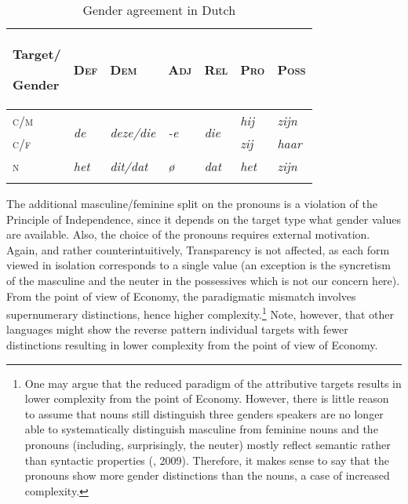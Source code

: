 \documentclass[output=collectionpaper]{langsci/langscibook}
\begin{document}
\begin{table}
\begin{tabularx}{\textwidth}{XXXXXXX}
\lsptoprule
{\bfseries Target/}

\bfseries Gender & \bfseries \textsc{Def} & \bfseries \textsc{Dem} & \bfseries \textsc{Adj} & \bfseries \textsc{Rel} & \bfseries \textsc{Pro} & \bfseries \textsc{Poss}\\
\midrule
\textsc{c/m} & \multirow{2}{*}{\textit{de}} & \multirow{2}{*}{\textit{deze/die}} & \multirow{2}{*}{\textit{{}-e}} & \multirow{2}{*}{\textit{die}} & \textit{hij} & \textit{zijn}\\
\textsc{c/f} &  &  &  &  & \textit{zij} & \textit{haar}\\
\textsc{n} & \textit{het} & \textit{dit/dat} & \textit{ø}\footnotemark{} & \textit{dat} & \textit{het} & \textit{zijn}\\
\lspbottomrule
\end{tabularx}
\caption{Gender agreement in Dutch}
\label{tab:Audr:4}
\end{table}
%

The additional masculine/feminine split on the pronouns is a violation of the Principle of Independence, since it depends on the target type what gender values are available. Also, the choice of the pronouns requires external motivation. Again, and rather counterintuitively, Transparency is not affected, as each form viewed in isolation corresponds to a single value (an exception is the syncretism of the masculine and the neuter in the possessives which is not our concern here). From the point of view of Economy, the paradigmatic mismatch involves supernumerary distinctions, hence higher complexity.\footnote{One may argue that the reduced paradigm of the attributive targets results in lower complexity from the point of Economy. However, there is little reason to assume that  nouns still distinguish three genders \textendash{} speakers are no longer able to systematically distinguish masculine from feminine nouns \textendash{} and the pronouns (including, surprisingly, the neuter) mostly reflect semantic rather than syntactic properties (\citealt{Audring2006}, 2009). Therefore, it makes sense to say that the pronouns show more gender distinctions than the nouns, a case of increased complexity.} Note, however, that other languages might show the reverse pattern \textendash{} individual targets with fewer distinctions \textendash{} resulting in lower complexity from the point of view of Economy.
\end{document}
